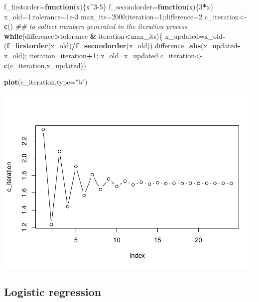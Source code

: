 \documentclass[]{book}
\newenvironment{Shaded}{\begin{snugshade}}{\end{snugshade}}
\newcommand{\CommentTok}[1]{\textcolor[rgb]{0.56,0.35,0.01}{\textit{#1}}}
\newcommand{\ControlFlowTok}[1]{\textcolor[rgb]{0.13,0.29,0.53}{\textbf{#1}}}
\newcommand{\DataTypeTok}[1]{\textcolor[rgb]{0.13,0.29,0.53}{#1}}
\newcommand{\DecValTok}[1]{\textcolor[rgb]{0.00,0.00,0.81}{#1}}
\newcommand{\FloatTok}[1]{\textcolor[rgb]{0.00,0.00,0.81}{#1}}
\newcommand{\KeywordTok}[1]{\textcolor[rgb]{0.13,0.29,0.53}{\textbf{#1}}}
\newcommand{\NormalTok}[1]{#1}
\newcommand{\OperatorTok}[1]{\textcolor[rgb]{0.81,0.36,0.00}{\textbf{#1}}}
\newcommand{\StringTok}[1]{\textcolor[rgb]{0.31,0.60,0.02}{#1}}
\begin{document}
\begin{Shaded}
\begin{Highlighting}[]
\NormalTok{f_firstorder=}\ControlFlowTok{function}\NormalTok{(x)\{x}\OperatorTok{^}\DecValTok{3-5}\NormalTok{\}}
\NormalTok{f_secondorder=}\ControlFlowTok{function}\NormalTok{(x)\{}\DecValTok{3}\OperatorTok{*}\NormalTok{x\}}
\NormalTok{x_old=}\DecValTok{1}\NormalTok{;tolerance=}\FloatTok{1e-3}
\NormalTok{max_its=}\DecValTok{2000}\NormalTok{;iteration=}\DecValTok{1}\NormalTok{;difference=}\DecValTok{2}
\NormalTok{c_iteration<-}\KeywordTok{c}\NormalTok{() }\CommentTok{## to collect numbers generated in the iteration process }
\ControlFlowTok{while}\NormalTok{(difference}\OperatorTok{>}\NormalTok{tolerance }\OperatorTok{&}\StringTok{ }\NormalTok{iteration}\OperatorTok{<}\NormalTok{max_its)\{}
\NormalTok{  x_updated=x_old}\OperatorTok{-}\NormalTok{(}\KeywordTok{f_firstorder}\NormalTok{(x_old)}\OperatorTok{/}\KeywordTok{f_secondorder}\NormalTok{(x_old))}
\NormalTok{  difference=}\KeywordTok{abs}\NormalTok{(x_updated}\OperatorTok{-}\NormalTok{x_old);}
\NormalTok{  iteration=iteration}\OperatorTok{+}\DecValTok{1}\NormalTok{;}
\NormalTok{  x_old=x_updated}
\NormalTok{  c_iteration<-}\KeywordTok{c}\NormalTok{(c_iteration,x_updated)\}}

\KeywordTok{plot}\NormalTok{(c_iteration,}\DataTypeTok{type=}\StringTok{"b"}\NormalTok{)}
\end{Highlighting}
\end{Shaded}

\includegraphics{bookdown-demo_files/figure-latex/unnamed-chunk-23-1.pdf}

\hypertarget{logistic-regression}{%
\subsection{Logistic regression}\label{logistic-regression}}
\end{document}
